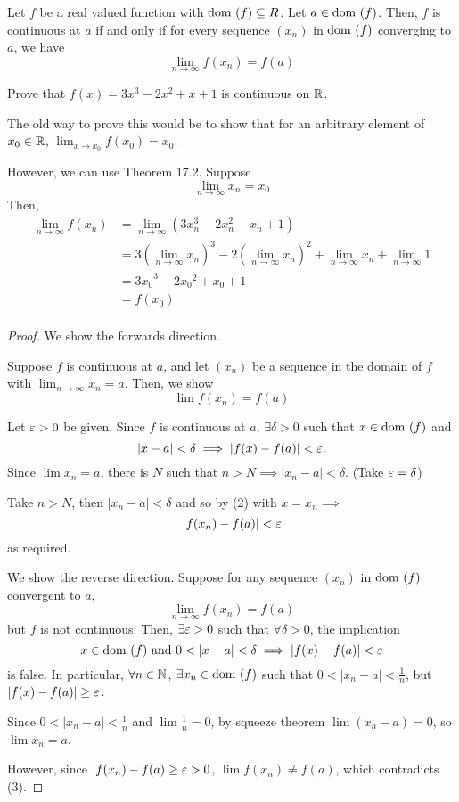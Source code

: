 \documentclass{article}
\begin{document}
\begin{cthm}[Theorem 17.2]
Let $f$ be a real valued function with $\text{dom }(f) \subseteq R$.
Let $a \in \text{dom }(f)$. Then, $f$ is continuous at $a$ if and only if for every sequence $(x_n)$ in $\text{dom }(f)$ converging to $a$, we have \[\lim_{n\to\infty} f(x_n) = f(a)\]
\end{cthm}
\begin{example}
Prove that $f(x) = 3x^3 - 2x^2 + x + 1$ is continuous on $\mathbb{R}$.

The old way to prove this would be to show that for an arbitrary element of $x_0 \in \mathbb{R}$, $\lim_{x\to x_0} f(x_0) = x_0$.

However, we can use Theorem 17.2.
Suppose \[
\lim_{n\to\infty}x_n = x_0
\]
Then, \begin{align*}
    \lim_{n\to\infty} f(x_n) &= \lim_{n\to\infty} (3x_n^3 - 2x_n^2 + x_n + 1)\\
    &= 3(\lim_{n\to\infty} x_n)^3 - 2(\lim_{n\to\infty}x_n)^2 + \lim_{n\to\infty} x_n + \lim_{n\to\infty} 1\\
    &= {3x_0}^3  -2{x_0}^2 +x_0 + 1\\
    &= f(x_0)\\
\end{align*}
\end{example}
\begin{proof}
We show the forwards direction. 

Suppose $f$ is continuous at $a$, and let $(x_n)$ be a sequence in the domain of $f$ with $\lim_{n\to\infty} x_n = a$. Then, we show \[\lim f(x_n) = f(a)\] 

Let $\varepsilon > 0$ be given. Since $f$ is continuous at $a$, $\exists \delta > 0$ such that $x \in \text{dom }(f)$ and \begin{equation}
    |x-a| < \delta \implies |f(x) - f(a)| < \varepsilon.
\end{equation}
Since $\lim x_n = a$, there is $N$ such that $n > N \implies |x_n - a| < \delta$. (Take $\varepsilon = \delta$)

Take $n > N$, then $|x_n - a| < \delta$ and so by (2) with $x = x_n \implies$
\[
|f(x_n) - f(a)| < \varepsilon
\]
as required.

We show the reverse direction.
Suppose for any sequence $(x_n)$ in $\text{dom }(f)$ convergent to $a$, \begin{equation}
    \lim_{n\to\infty} f(x_n) = f(a)
\end{equation}
but $f$ is not continuous. Then, $\exists \varepsilon > 0$ such that $\forall \delta > 0$, the implication \[
x \in \text{dom }(f) \text{ and } 0 < |x-a| < \delta \implies |f(x) - f(a)| < \varepsilon
\]
is false. In particular, $\forall n \in \mathbb{N}$, $\exists x_n \in \text{dom }(f)$ such that $0 < |x_n - a| < \frac{1}{n}$, but $|f(x) - f(a)| \geq \varepsilon$.

Since $0 < |x_n - a| < \frac{1}{n}$ and $\lim \frac{1}{n} = 0$, by squeeze theorem $\lim (x_n - a) = 0$, so $\lim x_n = a$.

However, since $|f(x_n) - f(a) \geq \varepsilon > 0$, $\lim f(x_n) \not = f(a)$, which contradicts (3). 
\end{proof}
\end{document}
